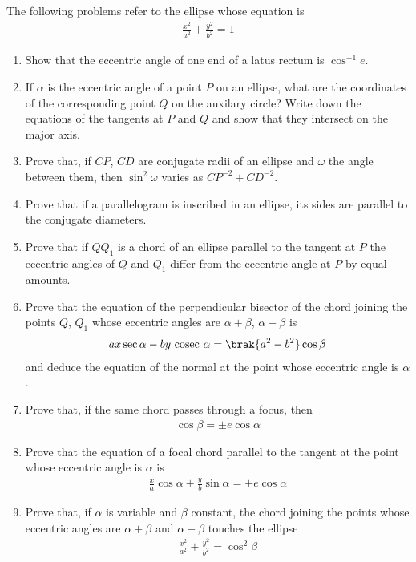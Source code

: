 The following problems refer to the ellipse whose 
equation is
\begin{align*}
\frac{x^2}{a^2}+\frac{y^2}{b^2} = 1
\end{align*}
\begin{enumerate}[1.]
\item Show that the eccentric angle of one end of a latus rectum is $\cos^{-1}e$.
\item If $\alpha$ is the eccentric angle of a point $P$ on an ellipse, what are the coordinates of the
corresponding point $Q$ on the auxilary circle?
Write down the equations of the tangents at $P$ and $Q$ and show that they intersect on the major axis.
\item Prove that, if $CP$, $CD$ are conjugate radii of an ellipse and $\omega$ the angle between them, then
$\sin^{2}\omega$ varies as $CP^{-2}+CD^{-2}$.
\item Prove that if a parallelogram is inscribed in an ellipse, its sides are parallel to 
the conjugate diameters.
\item Prove that if $QQ_1$ is a chord of an ellipse parallel to the tangent at $P$ the eccentric angles
of $Q$ and $Q_1$ differ from the eccentric angle at $P$ by equal amounts.
\item Prove that the equation of the perpendicular bisector of the chord joining the points $Q$, $Q_1$ whose
eccentric angles are $\alpha+\beta$, $\alpha-\beta$ is 
\begin{align*}
ax\sec\alpha -by\text{ cosec } \alpha = \brak{a^2-b^2}\cos\beta
\end{align*}
and deduce the equation of the normal at the point whose eccentric angle is $\alpha$.
\item Prove that, if the same chord passes through a focus, then
\begin{align*}
\cos\beta = \pm e \cos\alpha
\end{align*}
\item Prove that the equation of a focal chord parallel to the tangent at the point whose
eccentric angle is $\alpha$ is
\begin{align*}
\frac{x}{a}\cos\alpha + \frac{y}{b}\sin\alpha = \pm e \cos\alpha
\end{align*}
\item Prove that, if $\alpha$ is variable and $\beta$ constant, the chord joining the points whose eccentric angles are $\alpha+\beta$
and $\alpha-\beta$ touches the
ellipse
\begin{align*}
\frac{x^2}{a^2}+\frac{y^2}{b^2} = \cos^2\beta

\end{align*}
\end{enumerate}
